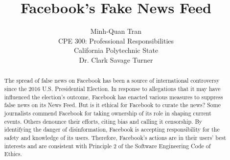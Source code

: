 

\title{\vfill Facebook's Fake News Feed\\
\vspace{8pt}
\normalsize{}
}

\author{Minh-Quan Tran\\
\normalsize{CPE 300: Professional Responsibilities}\\
\normalsize{California Polytechnic State}\\
\normalsize{Dr. Clark Savage Turner}
}

\maketitle


\vfill

\begin{abstract}
The spread of false news on Facebook has been a source of international controversy since the 2016 U.S. Presidential Election. \cite{telegraph_fn} In response to allegations that it may have influenced the election's outcome, \cite{tc_snowden,stanford_election} Facebook has enacted various measures to suppress false news on its News Feed. \cite{fb_hoaxes_2016,guardian_tips} But is it ethical for Facebook to curate the news? Some journalists commend Facebook for taking ownership of its role in shaping current events. \cite{cnn_fight} Others denounce their efforts, citing bias \cite{vox_sentences} and calling it censorship. \cite{milo_censor} By identifying the danger of disinformation, Facebook is accepting responsibility for the safety and knowledge of its users. Therefore, Facebook's actions are in their users' best interests and are consistent with Principle 2 of the Software Engineering Code of Ethics. \cite{se_code} 
\end{abstract}

\thispagestyle{empty} 
\pagebreak